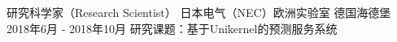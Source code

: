 \cventry
{研究科学家（Research Scientist）} %
{日本电气（NEC）欧洲实验室} %
{德国海德堡} %
{2018年6月 - 2018年10月} %
{ %
研究课题：基于Unikernel的预测服务系统
}
